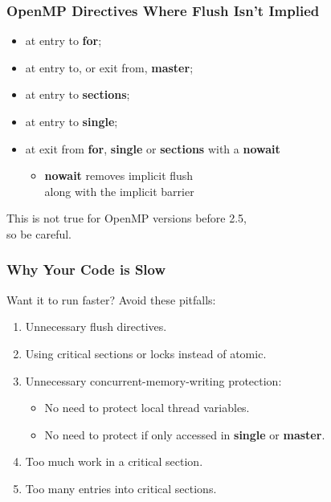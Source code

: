 \begin{frame} 
  \frametitle{OpenMP Directives Where Flush Isn't Implied}

\large
  \begin{itemize}
    \item at entry to {\bf for};
    \item at entry to, or exit from, {\bf master};
    \item at entry to {\bf sections}; 
    \item at entry to {\bf single};
    \item at exit from {\bf for}, {\bf single} or {\bf sections} with a {\bf nowait}
      \begin{itemize}
        \item {\bf nowait} removes implicit flush\\
 along with the implicit barrier
      \end{itemize}
  \end{itemize}

  This is not true for OpenMP versions before 2.5,\\
 so be careful.

\end{frame}


\begin{frame}
  \frametitle{Why Your Code is Slow}

  \large
  Want it to run faster? Avoid these pitfalls:\\
  \begin{enumerate}
    \item Unnecessary flush directives.
    \item Using critical sections or locks instead of atomic.
    \item Unnecessary concurrent-memory-writing protection:
      \begin{itemize}
        \item No need to protect local thread variables.
        \item No need to protect if only accessed in {\bf single} or
          {\bf master}.
      \end{itemize}
    \item Too much work in a critical section.
    \item Too many entries into critical sections.
  \end{enumerate}
  
\end{frame}

